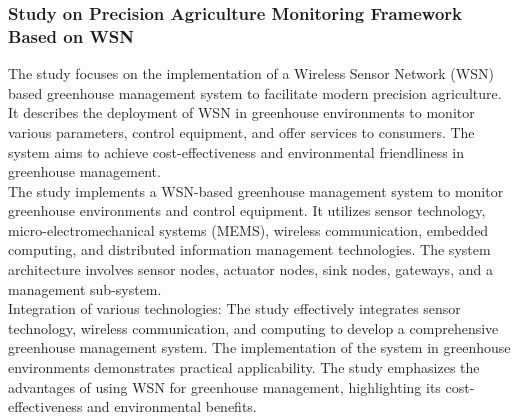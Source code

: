 \documentclass[12pt, a4paper]{article}
\begin{document}
\subsubsection{Study on Precision Agriculture Monitoring Framework Based on WSN}
The study focuses on the implementation of a Wireless Sensor Network (WSN) based greenhouse management system to facilitate modern precision agriculture. It describes the deployment of WSN in greenhouse environments to monitor various parameters, control equipment, and offer services to consumers. The system aims to achieve cost-effectiveness and environmental friendliness in greenhouse management.\\
The study implements a WSN-based greenhouse management system to monitor greenhouse environments and control equipment. It utilizes sensor technology, micro-electromechanical systems (MEMS), wireless communication, embedded computing, and distributed information management technologies. The system architecture involves sensor nodes, actuator nodes, sink nodes, gateways, and a management sub-system.\\
 Integration of various technologies: The study effectively integrates sensor technology, wireless communication, and computing to develop a comprehensive greenhouse management system.
The implementation of the system in greenhouse environments demonstrates practical applicability. The study emphasizes the advantages of using WSN for greenhouse management, highlighting its cost-effectiveness and environmental benefits.
\end{document}
